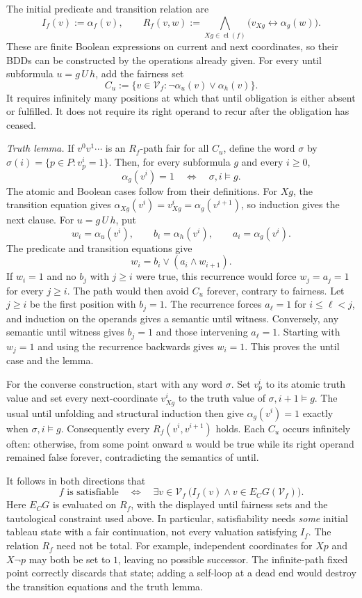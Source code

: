 The initial predicate and transition relation are
\[
 I_f(v):=\alpha_f(v),\qquad
 R_f(v,w):=
   \bigwedge_{Xg\in\operatorname{el}(f)}
        \bigl(v_{Xg}\leftrightarrow\alpha_g(w)\bigr).
\]
These are finite Boolean expressions on current and next coordinates,
so their BDDs can be constructed by the operations already given.
For every until subformula \(u=g\,U\,h\), add the fairness set
\[
 C_u:=\{v\in\mathcal V_f:
              \neg\alpha_u(v)\lor\alpha_h(v)\}.
\]
It requires infinitely many positions at which that until obligation
is either absent or fulfilled. It does not require its right operand
to recur after the obligation has ceased.

\emph{Truth lemma.}
If \(v^0v^1\cdots\) is an \(R_f\)-path fair for all \(C_u\), define
the word \(\sigma\) by
\(\sigma(i)=\{p\in P:v^i_p=1\}\). Then, for every subformula \(g\)
and every \(i\geq0\),
\[
 \alpha_g(v^i)=1\quad\Longleftrightarrow\quad\sigma,i\models g.
\]
The atomic and Boolean cases follow from their definitions. For \(Xg\),
the transition equation gives
\(\alpha_{Xg}(v^i)=v^i_{Xg}=\alpha_g(v^{i+1})\), so induction
gives the next clause.
For \(u=g\,U\,h\), put
\[
 w_i=\alpha_u(v^i),\qquad
 b_i=\alpha_h(v^i),\qquad a_i=\alpha_g(v^i).
\]
The predicate and transition equations give
\[
 w_i=b_i\lor(a_i\land w_{i+1}).
\]
If \(w_i=1\) and no \(b_j\) with \(j\geq i\) were true, this
recurrence would force \(w_j=a_j=1\) for every \(j\geq i\).
The path would then avoid \(C_u\) forever, contrary to fairness.
Let \(j\geq i\) be the first position with \(b_j=1\).
The recurrence forces \(a_\ell=1\) for \(i\leq\ell<j\), and
induction on the operands gives a semantic until witness.
Conversely, any semantic until witness gives \(b_j=1\) and those
intervening \(a_\ell=1\). Starting with \(w_j=1\) and using the
recurrence backwards gives \(w_i=1\). This proves the until case
and the lemma.

For the converse construction, start with any word \(\sigma\).
Set \(v^i_p\) to its atomic truth value and set every next-coordinate
\(v^i_{Xg}\) to the truth value of \(\sigma,i+1\models g\).
The usual until unfolding and structural induction then give
\(\alpha_g(v^i)=1\) exactly when \(\sigma,i\models g\).
Consequently every \(R_f(v^i,v^{i+1})\) holds. Each \(C_u\)
occurs infinitely often: otherwise, from some point onward \(u\)
would be true while its right operand remained false forever,
contradicting the semantics of until.

It follows in both directions that
\[
 f\text{ is satisfiable}
 \quad\Longleftrightarrow\quad
 \exists v\in\mathcal V_f\
     \bigl(I_f(v)\land v\in E_CG(\mathcal V_f)\bigr).
\]
Here \(E_CG\) is evaluated on \(R_f\), with the displayed until
fairness sets and the tautological constraint used above. In
particular, satisfiability needs \emph{some} initial tableau state
with a fair continuation, not every valuation satisfying \(I_f\).
The relation \(R_f\) need not be total. For example, independent
coordinates for \(Xp\) and \(X\neg p\) may both be set to \(1\),
leaving no possible successor. The infinite-path fixed point
correctly discards that state; adding a self-loop at a dead end
would destroy the transition equations and the truth lemma.

